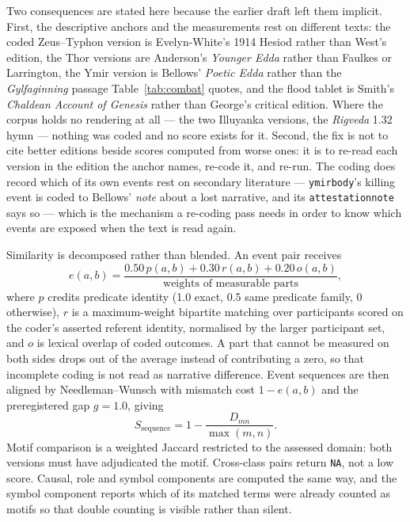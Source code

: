 \documentclass[11pt]{article}
\DeclareRobustCommand{\_}{\textunderscore\allowbreak}
\newcommand{\field}[1]{\texttt{\small #1}}
\begin{document}
Two consequences are stated here because the earlier draft left them implicit. First, the
descriptive anchors and the measurements rest on different texts: the coded Zeus--Typhon
version is Evelyn-White's 1914 Hesiod rather than West's edition, the Thor versions are
Anderson's \emph{Younger Edda} rather than Faulkes or Larrington, the Ymir version is
Bellows' \emph{Poetic Edda} rather than the \emph{Gylfaginning} passage Table~\ref{tab:combat}
quotes, and the flood tablet is Smith's \emph{Chaldean Account of Genesis} rather than
George's critical edition. Where the corpus holds no rendering at all --- the two
Illuyanka versions, the \emph{Rigveda} 1.32 hymn --- nothing was coded and no score exists
for it. Second, the fix is not to cite better editions beside scores computed from worse
ones: it is to re-read each version in the edition the anchor names, re-code it, and
re-run. The coding does record which of its own events rest on secondary literature ---
\texttt{ymir\_body}'s killing event is coded to Bellows' \emph{note} about a lost
narrative, and its \texttt{attestation\_note} says so --- which is the mechanism a
re-coding pass needs in order to know which events are exposed when the text is read
again.

Similarity is decomposed rather than blended. An event pair receives
\begin{equation}
  e(a,b) = \frac{0.50\,p(a,b) + 0.30\,r(a,b) + 0.20\,o(a,b)}
               {\text{weights of measurable parts}},
\end{equation}
where \(p\) credits predicate identity (1.0 exact, 0.5 same predicate family, 0
otherwise), \(r\) is a maximum-weight bipartite matching over participants scored
on the coder's asserted referent identity, normalised by the larger participant
set, and \(o\) is lexical overlap of coded outcomes. A part that cannot be
measured on both sides drops out of the average instead of contributing a zero, so
that incomplete coding is not read as narrative difference. Event sequences are
then aligned by Needleman--Wunsch with mismatch cost \(1-e(a,b)\) and the
preregistered gap \(g = 1.0\), giving
\begin{equation}
  S_{\mathrm{sequence}} = 1 - \frac{D_{mn}}{\max(m,n)} .
\end{equation}
Motif comparison is a weighted Jaccard restricted to the assessed domain: both
versions must have adjudicated the motif. Cross-class pairs return \field{NA},
not a low score. Causal, role and symbol components are computed the same way,
and the symbol component reports which of its matched terms were already counted
as motifs so that double counting is visible rather than silent.
\end{document}
